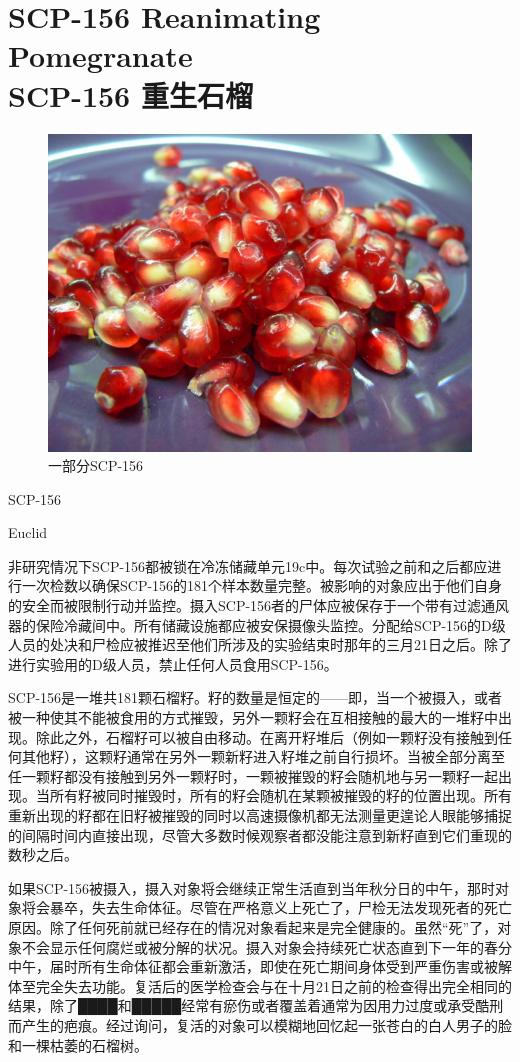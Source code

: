 \chapter[SCP-156 重生石榴]{
    SCP-156 Reanimating Pomegranate \\
    SCP-156 重生石榴
}

\label{chap:SCP-156}

\begin{figure}[H]
    \centering
    \includegraphics[width=0.5\linewidth]{images/SCP-156.jpg}
    \caption*{一部分SCP-156}
\end{figure}

SCP-156

Euclid

非研究情况下SCP-156都被锁在冷冻储藏单元19c中。每次试验之前和之后都应进行一次检数以确保SCP-156的181个样本数量完整。被影响的对象应出于他们自身的安全而被限制行动并监控。摄入SCP-156者的尸体应被保存于一个带有过滤通风器的保险冷藏间中。所有储藏设施都应被安保摄像头监控。分配给SCP-156的D级人员的处决和尸检应被推迟至他们所涉及的实验结束时那年的三月21日之后。除了进行实验用的D级人员，禁止任何人员食用SCP-156。

SCP-156是一堆共181颗石榴籽。籽的数量是恒定的——即，当一个被摄入，或者被一种使其不能被食用的方式摧毁，另外一颗籽会在互相接触的最大的一堆籽中出现。除此之外，石榴籽可以被自由移动。在离开籽堆后（例如一颗籽没有接触到任何其他籽），这颗籽通常在另外一颗新籽进入籽堆之前自行损坏。当被全部分离至任一颗籽都没有接触到另外一颗籽时，一颗被摧毁的籽会随机地与另一颗籽一起出现。当所有籽被同时摧毁时，所有的籽会随机在某颗被摧毁的籽的位置出现。所有重新出现的籽都在旧籽被摧毁的同时以高速摄像机都无法测量更遑论人眼能够捕捉的间隔时间内直接出现，尽管大多数时候观察者都没能注意到新籽直到它们重现的数秒之后。

如果SCP-156被摄入，摄入对象将会继续正常生活直到当年秋分日的中午，那时对象将会暴卒，失去生命体征。尽管在严格意义上死亡了，尸检无法发现死者的死亡原因。除了任何死前就已经存在的情况对象看起来是完全健康的。虽然“死”了，对象不会显示任何腐烂或被分解的状况。摄入对象会持续死亡状态直到下一年的春分中午，届时所有生命体征都会重新激活，即使在死亡期间身体受到严重伤害或被解体至完全失去功能。复活后的医学检查会与在十月21日之前的检查得出完全相同的结果，除了████和█████经常有瘀伤或者覆盖着通常为因用力过度或承受酷刑而产生的疤痕。经过询问，复活的对象可以模糊地回忆起一张苍白的白人男子的脸和一棵枯萎的石榴树。

